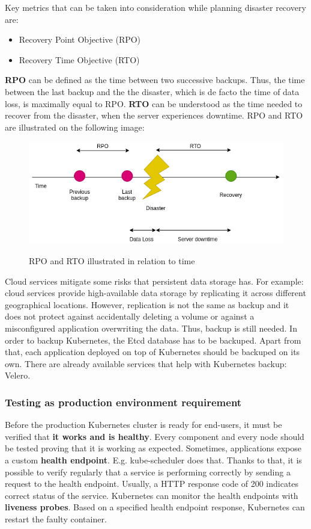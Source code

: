 Key metrics that can be taken into consideration while planning disaster recovery are\cite{article-dr}\cite{article-dr-cloud}:
\begin{itemize}
\item Recovery Point Objective (RPO)
\item Recovery Time Objective (RTO)
\end{itemize}
\textbf{RPO} can be defined as the time between two successive backups. Thus, the time between the last backup and the the disaster, which is de facto the time of data loss, is maximally equal to RPO. \textbf{RTO} can be understood as the time needed to recover from the disaster, when the server experiences downtime\cite{article-dr-cloud}. RPO and RTO are illustrated on the following image:
\begin{figure}[H]
    \centering
    \includegraphics[width=13cm]{figures/rpo-rto.png}
    \label{fig:rpo-rto}
    \caption{RPO and RTO illustrated in relation to time}
\end{figure}

Cloud services mitigate some risks that persistent data storage has. For example: cloud services provide high-available data storage by replicating it across different geographical locations. However, replication is not the same as backup and it does not protect against accidentally deleting a volume or against a misconfigured application overwriting the data. Thus, backup is still needed. In order to backup Kubernetes, the Etcd database has to be backuped. Apart from that, each application deployed on top of Kubernetes should be backuped on its own\cite{book-cndwk}. There are already available services that help with Kubernetes backup: Velero\cite{book-cndwk}.

\subsubsection{Testing as production environment requirement}
Before the production Kubernetes cluster is ready for end-users, it must be verified that \textbf{it works and is healthy}. Every component and every node should be tested proving that it is working as expected. Sometimes, applications expose a custom \textbf{health endpoint}\cite{book-devops-k8s}. E.g. kube-scheduler does that. Thanks to that, it is possible to verify regularly that a service is performing correctly by sending a request to the health endpoint. Usually, a HTTP response code of 200 indicates correct status of the service\cite{online-ms-health}. Kubernetes can monitor the health endpoints with \textbf{liveness probes}. Based on a specified health endpoint response, Kubernetes can restart the faulty container\cite{online-k8s-probes}.

